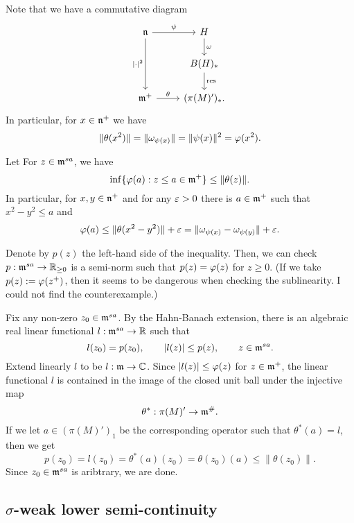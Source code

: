 \documentclass{../../small}
\begin{document}
Note that we have a commutative diagram
\[\begin{tikzcd}
\fn \ar{r}{\psi}\ar[swap]{dd}{|\cdot|^2} & H \ar{d}{\omega} \\
& B(H)_* \ar{d}{\mathrm{res}}\\
\fm^+ \ar{r}{\theta} & (\pi(M)')_*.
\end{tikzcd}\]
In particular, for $x\in\mathfrak{n}^+$ we have
\[\|\theta(x^2)\|=\|\omega_{\psi(x)}\|=\|\psi(x)\|^2=\varphi(x^2).\]


\begin{lem}
Let 
For $z\in\mathfrak{m}^{sa}$, we have
\[\inf\{\varphi(a):z\le a\in\mathfrak{m}^+\}\le\|\theta(z)\|.\]
In particular, for $x,y\in\mathfrak{n}^+$ and for any $\varepsilon>0$ there is $a\in\mathfrak{m}^+$ such that $x^2-y^2\le a$ and
\[\varphi(a)\le\|\theta(x^2-y^2)\|+\varepsilon=\|\omega_{\psi(x)}-\omega_{\psi(y)}\|+\varepsilon.\]
\end{lem}
\begin{pf}
Denote by $p(z)$ the left-hand side of the inequality.
Then, we can check $p:\mathfrak{m}^{sa}\to\mathbb{R}_{\ge0}$ is a semi-norm such that $p(z)=\varphi(z)$ for $z\ge0$.
(If we take $p(z):=\varphi(z^+)$, then it seems to be dangerous when checking the sublinearity. I could not find the counterexample.)

Fix any non-zero $z_0\in\mathfrak{m}^{sa}$.
By the Hahn-Banach extension, there is an algebraic real linear functional $l:\mathfrak{m}^{sa}\to\mathbb{R}$ such that
\[l(z_0)=p(z_0),\qquad |l(z)|\le p(z),\qquad z\in\mathfrak{m}^{sa}.\]
Extend linearly $l$ to be $l:\mathfrak{m}\to\mathbb{C}$.
Since $|l(z)|\le\varphi(z)$ for $z\in\mathfrak{m}^+$, the linear functional $l$ is contained in the image of the closed unit ball under the injective map
\[\theta^*:\pi(M)'\to\mathfrak{m}^\#.\]
If we let $a\in(\pi(M)')_1$ be the corresponding operator such that $\theta^*(a)=l$, then we get
\[p(z_0)=l(z_0)=\theta^*(a)(z_0)=\theta(z_0)(a)\le\|\theta(z_0)\|.\]
Since $z_0\in\mathfrak{m}^{sa}$ is aribtrary, we are done.
\end{pf}




\subsection{$\sigma$-weak lower semi-continuity}
\end{document}
